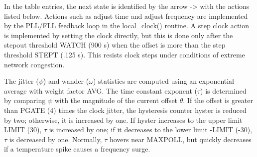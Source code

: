In the table entries, the next state is identified by the arrow ->
with the actions listed below. Actions such as adjust time and
adjust frequency are implemented by the PLL/FLL feedback loop in the
local\_clock() routine. A step clock action is implemented by setting
the clock directly, but this is done only after the stepout threshold
WATCH (900 s) when the offset is more than the step threshold STEPT
(.125 s). This resists clock steps under conditions of extreme
network congestion.

The jitter ($ \psi $) and wander ($ \omega $) statistics are computed using an
exponential average with weight factor AVG. The time constant
exponent ($ \tau $) is determined by comparing $ \psi $ with the magnitude of
the current offset $ \theta $. If the offset is greater than PGATE (4)
times the clock jitter, the hysteresis counter hyster is reduced by
two; otherwise, it is increased by one. If hyster increases to the
upper limit LIMIT (30), $ \tau $ is increased by one; if it decreases to
the lower limit -LIMIT (-30), $ \tau $ is decreased by one. Normally, $ \tau $
hovers near MAXPOLL, but quickly decreases if a temperature spike
causes a frequency surge.
